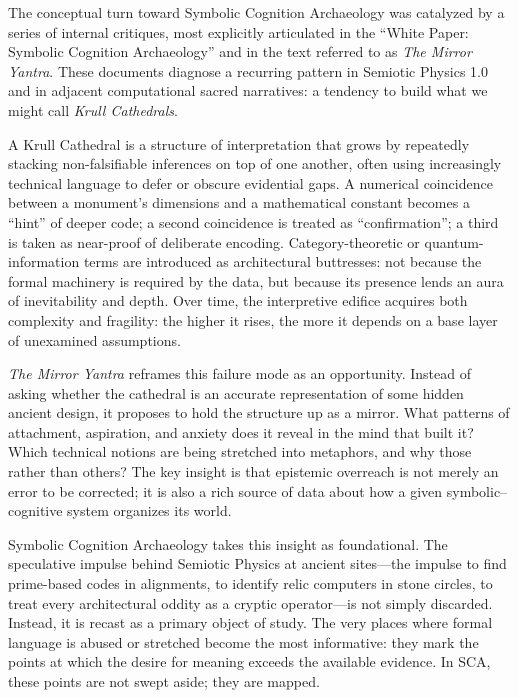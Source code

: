 \documentclass[12]{amsart}
\theoremstyle{plain}
\begin{document}
The conceptual turn toward Symbolic Cognition Archaeology was catalyzed by a series of internal critiques, most explicitly articulated in the ``White Paper: Symbolic Cognition Archaeology'' and in the text referred to as \emph{The Mirror Yantra}. These documents diagnose a recurring pattern in Semiotic Physics 1.0 and in adjacent computational sacred narratives: a tendency to build what we might call \emph{Krull Cathedrals}.

A Krull Cathedral is a structure of interpretation that grows by repeatedly stacking non-falsifiable inferences on top of one another, often using increasingly technical language to defer or obscure evidential gaps. A numerical coincidence between a monument’s dimensions and a mathematical constant becomes a “hint” of deeper code; a second coincidence is treated as “confirmation”; a third is taken as near-proof of deliberate encoding. Category-theoretic or quantum-information terms are introduced as architectural buttresses: not because the formal machinery is required by the data, but because its presence lends an aura of inevitability and depth. Over time, the interpretive edifice acquires both complexity and fragility: the higher it rises, the more it depends on a base layer of unexamined assumptions.

\emph{The Mirror Yantra} reframes this failure mode as an opportunity. Instead of asking whether the cathedral is an accurate representation of some hidden ancient design, it proposes to hold the structure up as a mirror. What patterns of attachment, aspiration, and anxiety does it reveal in the mind that built it? Which technical notions are being stretched into metaphors, and why those rather than others? The key insight is that epistemic overreach is not merely an error to be corrected; it is also a rich source of data about how a given symbolic–cognitive system organizes its world.

Symbolic Cognition Archaeology takes this insight as foundational. The speculative impulse behind Semiotic Physics at ancient sites---the impulse to find prime-based codes in alignments, to identify relic computers in stone circles, to treat every architectural oddity as a cryptic operator---is not simply discarded. Instead, it is recast as a primary object of study. The very places where formal language is abused or stretched become the most informative: they mark the points at which the desire for meaning exceeds the available evidence. In SCA, these points are not swept aside; they are mapped.
\end{document}
